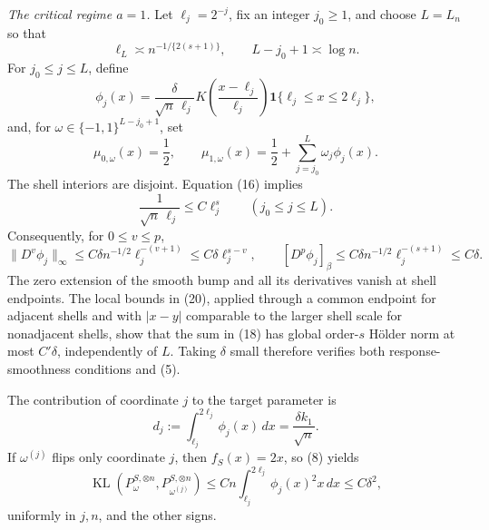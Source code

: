 \emph{The critical regime \(a=1\).}
Let \(\ell_j=2^{-j}\), fix an integer \(j_0\ge1\), and choose \(L=L_n\) so that
\[
 \ell_L\asymp n^{-1/\{2(s+1)\}},
 \qquad L-j_0+1\asymp\log n.
\tag{16}
\]
For \(j_0\le j\le L\), define
\[
 \phi_j(x)=\frac{\delta}{\sqrt n\,\ell_j}
 K\!\left(\frac{x-\ell_j}{\ell_j}\right)
 \mathbf 1\{\ell_j\le x\le2\ell_j\},
\tag{17}
\]
and, for \(\omega\in\{-1,1\}^{L-j_0+1}\), set
\[
 \mu_{0,\omega}(x)=\frac12,
 \qquad
 \mu_{1,\omega}(x)=\frac12+
 \sum_{j=j_0}^L\omega_j\phi_j(x).
\tag{18}
\]
The shell interiors are disjoint. Equation (16) implies
\[
 \frac1{\sqrt n\,\ell_j}\le C\ell_j^s
 \qquad(j_0\le j\le L).
\tag{19}
\]
Consequently, for \(0\le v\le p\),
\[
 \lVert D^v\phi_j\rVert_\infty
 \le C\delta n^{-1/2}\ell_j^{-(v+1)}
 \le C\delta\ell_j^{s-v},
 \qquad
 [D^p\phi_j]_{\beta}
 \le C\delta n^{-1/2}\ell_j^{-(s+1)}
 \le C\delta.
\tag{20}
\]
The zero extension of the smooth bump and all its derivatives vanish at shell endpoints. The local bounds in (20), applied through a common endpoint for adjacent shells and with \(|x-y|\) comparable to the larger shell scale for nonadjacent shells, show that the sum in (18) has global order-\(s\) H\"older norm at most \(C'\delta\), independently of \(L\). Taking \(\delta\) small therefore verifies both response-smoothness conditions and (5).

The contribution of coordinate \(j\) to the target parameter is
\[
 d_j:=\int_{\ell_j}^{2\ell_j}\phi_j(x)\,dx
 =\frac{\delta k_1}{\sqrt n}.
\tag{21}
\]
If \(\omega^{(j)}\) flips only coordinate \(j\), then \(f_S(x)=2x\), so (8) yields
\[
 \operatorname{KL}(P_\omega^{S,\otimes n},
                    P_{\omega^{(j)}}^{S,\otimes n})
 \le Cn\int_{\ell_j}^{2\ell_j}\phi_j(x)^2x\,dx
 \le C\delta^2,
\tag{22}
\]
uniformly in \(j,n\), and the other signs.

